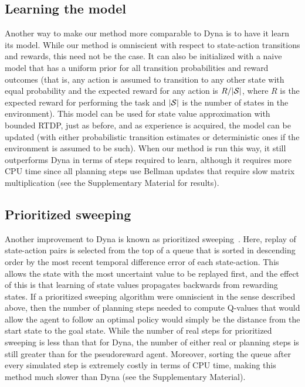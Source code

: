 \documentclass[letterpaper]{article}
\begin{document}
\subsection{Learning the model}

Another way to make our method more comparable to Dyna is to have it learn its model. While our method is omniscient with respect to state-action transitions and rewards, this need not be the case. It can also be initialized with a naive model that has a uniform prior for all transition probabilities and reward outcomes (that is, any action is assumed to transition to any other state with equal probability and the expected reward for any action is $R/|{\cal S}|$, where $R$ is the expected reward for performing the task and $|{\cal S}|$ is the number of states in the environment). This model can be used for state value approximation with bounded RTDP, just as before, and as experience is acquired, the model can be updated (with either probabilistic transition estimates or deterministic ones if the environment is assumed to be such). When our method is run this way, it still outperforms Dyna in terms of steps required to learn, although it requires more CPU time since all planning steps use Bellman updates that require slow matrix multiplication (see the Supplementary Material for results).

\subsection{Prioritized sweeping}

Another improvement to Dyna is known as prioritized sweeping~\cite{moore1993prioritized}. Here, replay of state-action pairs is selected from the top of a queue that is sorted in descending order by the most recent temporal difference error of each state-action. This allows the state with the most uncertaint value to be replayed first, and the effect of this is that learning of state values propagates backwards from rewarding states. If a prioritized sweeping algorithm were omniscient in the sense described above, then the number of planning steps needed to compute Q-values that would allow the agent to follow an optimal policy would simply be the distance from the start state to the goal state. While the number of real steps for prioritized sweeping is less than that for Dyna, the number of either real or planning steps is still greater than for the pseudoreward agent. Moreover, sorting the queue after every simulated step is extremely costly in terms of CPU time, making this method much slower than Dyna (see the Supplementary Material).
\end{document}
